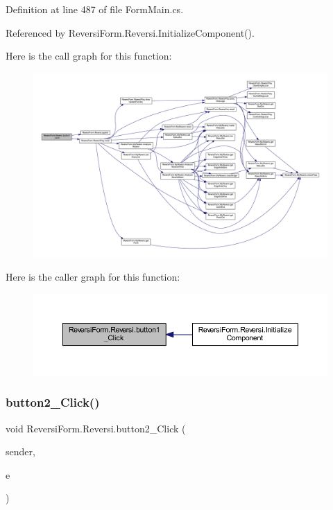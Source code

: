 Definition at line 487 of file Form\+Main.\+cs.



Referenced by Reversi\+Form.\+Reversi.\+Initialize\+Component().

Here is the call graph for this function\+:\nopagebreak
\begin{figure}[H]
\begin{center}
\leavevmode
\includegraphics[width=350pt]{class_reversi_form_1_1_reversi_a832e3ee4b606141b3feefb47742b3849_cgraph}
\end{center}
\end{figure}
Here is the caller graph for this function\+:\nopagebreak
\begin{figure}[H]
\begin{center}
\leavevmode
\includegraphics[width=350pt]{class_reversi_form_1_1_reversi_a832e3ee4b606141b3feefb47742b3849_icgraph}
\end{center}
\end{figure}
\mbox{\label{class_reversi_form_1_1_reversi_aa908556d4f216f8b407c1458e392dfc5}} 
\subsubsection{\texorpdfstring{button2\+\_\+\+Click()}{button2\_Click()}}
{\footnotesize\ttfamily void Reversi\+Form.\+Reversi.\+button2\+\_\+\+Click (\begin{DoxyParamCaption}\item[{object}]{sender,  }\item[{Event\+Args}]{e }\end{DoxyParamCaption})\hspace{0.3cm}{\ttfamily [private]}}



